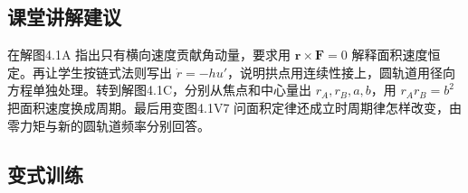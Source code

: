 \documentclass[UTF8,fontset=fandol,a4paper,11pt]{ctexart}
\newcommand{\vect}[1]{\bm{#1}}
\begin{document}


\subsection*{课堂讲解建议}

在解图4.1A 指出只有横向速度贡献角动量，要求用 $\vect r\times\vect F=0$ 解释面积速度恒定。再让学生按链式法则写出 $\dot r=-hu'$，说明拱点用连续性接上，圆轨道用径向方程单独处理。转到解图4.1C，分别从焦点和中心量出 $r_A,r_B,a,b$，用 $r_Ar_B=b^2$ 把面积速度换成周期。最后用变图4.1V7 问面积定律还成立时周期律怎样改变，由零力矩与新的圆轨道频率分别回答。



\subsection*{变式训练}
\end{document}
